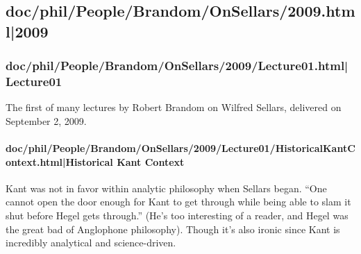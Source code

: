 \documentclass[12pt,a4paper]{report}
\begin{document}
\subsection{doc/phil/People/Brandom/OnSellars/2009.html|2009}

\subsubsection{doc/phil/People/Brandom/OnSellars/2009/Lecture01.html|Lecture01}
The first of many lectures by Robert Brandom on Wilfred Sellars, delivered on September 2, 2009.

\paragraph{doc/phil/People/Brandom/OnSellars/2009/Lecture01/HistoricalKantContext.html|Historical Kant Context}
Kant was not in favor within analytic philosophy when Sellars began. ``One cannot open the door enough for Kant to get through while being able to slam it shut before Hegel gets through.'' (He's too interesting of a reader, and Hegel was the great bad of Anglophone philosophy). Though it's also ironic since Kant is incredibly analytical and science-driven.
\end{document}
